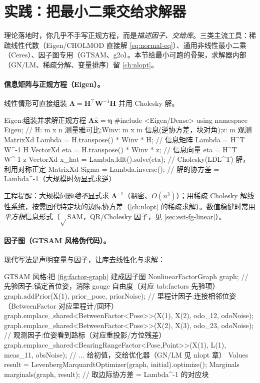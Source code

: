 \section{实践：把最小二乘交给求解器}
\label{sec:est-practice}

理论落地时，你几乎不手写正规方程，而是\emph{描述因子、交给库}。三类主流工具：稀疏线性代数（Eigen/CHOLMOD 直接解 \cref{eq:normal-eq}）、通用非线性最小二乘（Ceres）、因子图专用（GTSAM、g2o）。本节给最小可跑的骨架，求解器内部（GN/LM、稀疏分解、变量排序）留 \cref{ch:nlopt}。

\paragraph{信息矩阵与正规方程（Eigen）。}
线性情形可直接组装 $\boldsymbol{\Lambda}=\mathbf{H}^\top\mathbf{W}^{-1}\mathbf{H}$ 并用 Cholesky 解。

\begin{codebox}[C++]{Eigen:组装并求解正规方程 $\boldsymbol{\Lambda}\hat{\mathbf{x}}=\boldsymbol{\eta}$}
#include <Eigen/Dense>
using namespace Eigen;
// H: m x n 测量雅可比;Winv: m x m 信息(逆协方差，块对角);z: m 观测
MatrixXd Lambda = H.transpose() * Winv * H;   // 信息矩阵 Lambda = H^T W^-1 H
VectorXd eta    = H.transpose() * Winv * z;    // 信息向量 eta = H^T W^-1 z
VectorXd x_hat  = Lambda.ldlt().solve(eta);    // Cholesky(LDL^T) 解，利用对称正定
MatrixXd Sigma  = Lambda.inverse();            // 解的协方差 = Lambda^-1（大规模时勿显式求逆）
\end{codebox}

\noindent 工程提醒：大规模问题\emph{绝不}显式求 $\boldsymbol{\Lambda}^{-1}$（稠密、$O(n^3)$）；用稀疏 Cholesky 解线性系统，按需回代特定块的边际协方差（\cref{ch:nlopt} 的稀疏求解）。数值稳健时常用\emph{平方根}信息形式（$\sqrt{}$SAM，QR/Cholesky 因子，见 \cref{sec:est-fg-linear}）。

\paragraph{因子图（GTSAM 风格伪代码）。}
现代写法是声明变量与因子，让库去线性化与求解：

\begin{codebox}[C++]{GTSAM 风格:把 \cref{fig:factor-graph} 建成因子图}
NonlinearFactorGraph graph;
// 先验因子:锚定首位姿，消除 gauge 自由度（对应 tab:factors 先验项）
graph.addPrior(X(1), prior_pose, priorNoise);
// 里程计因子:连接相邻位姿（BetweenFactor 对应里程计/回环）
graph.emplace_shared<BetweenFactor<Pose>>(X(1), X(2), odo_12, odoNoise);
graph.emplace_shared<BetweenFactor<Pose>>(X(2), X(3), odo_23, odoNoise);
// 观测因子:位姿看到路标（对应重投影/方位残差）
graph.emplace_shared<BearingRangeFactor<Pose,Point>>(X(1), L(1), meas_11, obsNoise);
// ... 给初值，交给优化器（GN/LM 见 nlopt 章）
Values result = LevenbergMarquardtOptimizer(graph, initial).optimize();
Marginals marginals(graph, result);   // 取边际协方差 = Lambda^-1 的对应块
\end{codebox}

